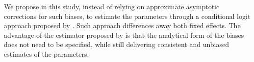 We propose in this study, instead of relying on approximate asymptotic corrections for such biases, to estimate the parameters through a conditional logit approach proposed by \cite{charbonneau2017multiple}. Such approach differences away both fixed effects. The advantage of the estimator proposed by \cite{charbonneau2017multiple} is that the analytical form of the biases does not need to be specified, while still delivering consistent and unbiased estimates of the parameters. 

